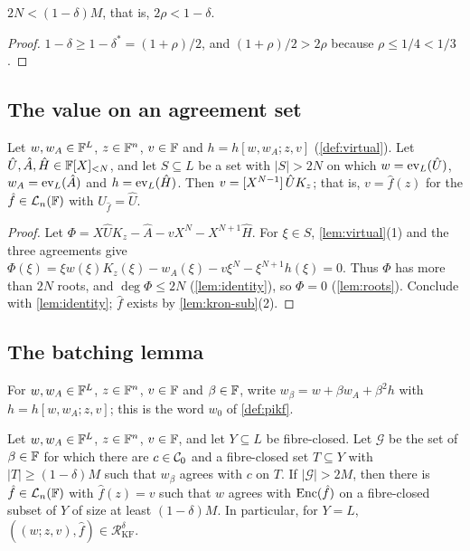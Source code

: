 \begin{lemma}\label{lem:rate}
$2N < (1-\delta)M$, that is, $2\rho < 1-\delta$.
\end{lemma}

\begin{proof}
$1 - \delta \ge 1 - \delta^* = (1+\rho)/2$, and $(1+\rho)/2 > 2\rho$ because $\rho \le 1/4 < 1/3$.
\end{proof}

\subsection{The value on an agreement set}\label{sec:sound:identity}

\begin{lemma}\label{lem:identity-set}
Let $w, w_A \in \mathbb{F}^L$, $z \in \mathbb{F}^n$, $v \in \mathbb{F}$ and $h = h[w,w_A;z,v]$ (\cref{def:virtual}).
Let $\hat U, \hat A, \hat H \in \mathbb{F}[X]_{<N}$, and let $S \subseteq L$ be a set with $|S| > 2N$ on which $w = \mathrm{ev}_L(\hat U)$, $w_A = \mathrm{ev}_L(\hat A)$ and $h = \mathrm{ev}_L(\hat H)$.
Then $v = [X^{N-1}]\,\hat U K_z$; that is, $v = \hat f(z)$ for the $\hat f \in \mathcal{L}_n(\mathbb{F})$ with $U_{\hat f} = \hat U$.
\end{lemma}

\begin{proof}
Let $\Phi = X\hat U K_z - \hat A - vX^N - X^{N+1}\hat H$. For $\xi \in S$, \cref{lem:virtual}(1) and the three agreements give $\Phi(\xi) = \xi w(\xi) K_z(\xi) - w_A(\xi) - v\xi^N - \xi^{N+1}h(\xi) = 0$.
Thus $\Phi$ has more than $2N$ roots, and $\deg \Phi \le 2N$ (\cref{lem:identity}), so $\Phi = 0$ (\cref{lem:roots}).
Conclude with \cref{lem:identity}; $\hat f$ exists by \cref{lem:kron-sub}(2).
\end{proof}

\subsection{The batching lemma}\label{sec:sound:batching}

For $w, w_A \in \mathbb{F}^L$, $z \in \mathbb{F}^n$, $v \in \mathbb{F}$ and $\beta \in \mathbb{F}$, write $w_\beta = w + \beta w_A + \beta^2 h$ with $h = h[w,w_A;z,v]$; this is the word $w_0$ of \cref{def:pikf}.

\begin{lemma}[Batching]\label{lem:batching}
Let $w, w_A \in \mathbb{F}^L$, $z \in \mathbb{F}^n$, $v \in \mathbb{F}$, and let $Y \subseteq L$ be fibre-closed.
Let $\mathcal{G}$ be the set of $\beta \in \mathbb{F}$ for which there are $c \in \mathcal{C}_0$ and a fibre-closed set $T \subseteq Y$ with $|T| \ge (1-\delta)M$ such that $w_\beta$ agrees with $c$ on $T$.
If $|\mathcal{G}| > 2M$, then there is $\hat f \in \mathcal{L}_n(\mathbb{F})$ with $\hat f(z) = v$ such that $w$ agrees with $\mathrm{Enc}(\hat f)$ on a fibre-closed subset of $Y$ of size at least $(1-\delta)M$.
In particular, for $Y = L$, $((w;z,v),\hat f) \in \mathcal{R}^\delta_{\mathrm{KF}}$.
\end{lemma}

